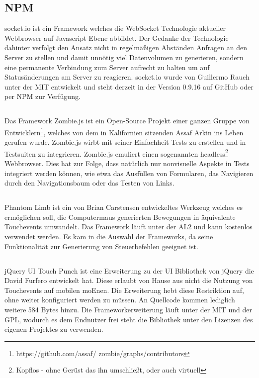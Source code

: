 	\subsection{NPM }
	socket.io ist ein \Gls{Framework} welches die WebSocket Technologie aktueller \Gls{Webbrowser} auf \Gls{Javascript} Ebene abbildet. Der Gedanke der Technologie dahinter verfolgt den Ansatz nicht in regelmäßigen Abständen Anfragen an den Server zu stellen und damit unnötig viel Datenvolumen zu generieren, sondern eine permanente Verbindung zum Server aufrecht zu halten um auf Statusänderungen am Server zu reagieren. socket.io wurde von Guillermo Rauch unter der \Gls{MIT} entwickelt und steht derzeit in der Version 0.9.16 auf GitHub oder per \Gls{NPM} zur Verfügung.
	
	\subsection{}
	Das \Gls{Framework} Zombie.js ist ein Open-Source Projekt einer ganzen Gruppe von Entwicklern\footnote{https://github.com/assaf/	zombie/graphs/contributors}, welches von dem in Kalifornien sitzenden Assaf Arkin ins Leben gerufen wurde. Zombie.js wirbt mit 	seiner Einfachheit \Gls{Test}s zu erstellen und in \Gls{Test}suiten zu integrieren. Zombie.js emuliert einen sogenannten headless\footnote{Kopflos - ohne Gerüst das ihn umschließt, oder auch virtuell} \Gls{Webbrowser}. Dies hat zur Folge, dass natürlich nur nonvisuelle Aspekte in \Gls{Test}s integriert werden können, wie etwa das Ausfüllen von Formularen, das Navigieren durch den Navigationsbaum oder das Testen von Links.

	\subsection{}
	Phantom Limb ist ein von Brian Carstensen entwickeltes Werkzeug welches es ermöglichen soll, die \Gls{Computer}maus generierten Bewegungen in äquivalente \mbox{Touchevents} umwandelt. Das \Gls{Framework} läuft unter der \Gls{AL2} und kann kostenlos 	verwendet werden. Es kam in die Auswahl der \Gls{Framework}s, da seine Funktionalität zur Generierung von Steuerbefehlen geeignet ist.
	
	\subsection{}
	jQuery UI Touch Punch ist eine Erweiterung zu der UI Bibliothek von jQuery die David Furfero entwickelt hat. Diese erlaubt von 	Hause aus nicht die Nutzung von Touchevents auf mobilen \Gls{moEn}en. Die Erweiterung hebt diese Restriktion auf, ohne weiter konfiguriert werden zu müssen. An Quellcode kommen lediglich weitere 584 Bytes hinzu. Die \Gls{Framework}erweiterung läuft unter der MIT und der \Gls{GPL}, wodurch es dem Endnutzer frei steht die Bibliothek unter den Lizenzen des eigenen Projektes zu verwenden.
	
